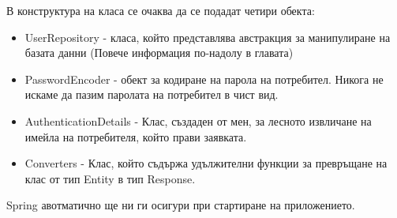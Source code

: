         \begin{figure}[h]
            \centering
            \caption{}
            \label{fig:user_service}
        \end{figure}
        
        В конструктура на класа се очаква да се подадат четири обекта:
        \begin{itemize}
            \item UserRepository - класа, който представлява австракция за манипулиране на базата данни (Повече информация по-надолу в главата)
            \item PasswordEncoder - обект за кодиране на парола на потребител. Никога не искаме да пазим паролата на потребител в чист вид. 
            \item AuthenticationDetails - Клас, създаден от мен, за лесното извличане  на имейла на потребителя, който прави заявката.
            \item Converters - Клас, който съдържа удължителни функции за превръщане на клас от тип Entity в тип Response.
        \end{itemize}
        
        Spring авотматично ще ни ги осигури при стартиране на приложението.
        
        \begin{figure}[h]
            \centering
            \caption{}
            \label{fig:auth_details}
        \end{figure}
        
